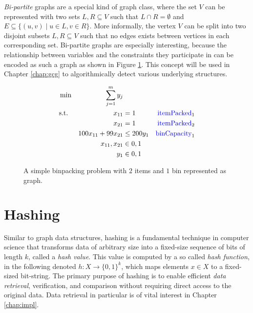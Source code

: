 		\textit{Bi-partite} graphs are a special kind of graph class, where the set $V$ can be represented with two sets $L, R \subseteq V$ such that $L \cap R = \emptyset$ and $E \subseteq \{ (u, v) \mid u \in L, v \in R \}$.
		More informally, the vertex $V$ can be split into two disjoint subsets $L, R \subseteq V$ such that no edges exists between vertices in each corresponding set.
		Bi-partite graphs are especially interesting, because the relationship between variables and the constraints they participate in can be encoded as such a graph as shown in Figure \ref{fig:prelims:graphs:binpackbipartite}. This concept will be used in Chapter \ref{chap:gcg} to algorithmically detect various underlying structures. 
		\begin{figure}[ht!]
			\centering
			\begin{minipage}{0.47\textwidth}
				
			\end{minipage}
			\begin{minipage}{0.47\textwidth}
				\begin{align}
					&\min &\sum_{j=1}^m y_j \nonumber \\
					&\text{s.t.} &x_{11} &= 1 & \text{\textcolor{blue}{itemPacked}}_1 \nonumber \\
					&& x_{21} &= 1 & \text{\textcolor{blue}{itemPacked}}_2\nonumber \\
					&& 100 x_{11} + 99 x_{21} &\leq 200 y_1 & \text{\textcolor{blue}{binCapacity}}_1\nonumber \\
					&& x_{11}, x_{21} &\in { 0, 1 }  \nonumber \\
					&& y_1 &\in { 0, 1 } \nonumber
				\end{align}
			\end{minipage}
			\caption{A simple binpacking problem with $2$ items and $1$ bin represented as  graph.}
			\label{fig:prelims:graphs:binpackbipartite}
		\end{figure}
	
		\clearpage
		
	\section{Hashing}
		
		Similar to graph data structures, hashing is a fundamental technique in computer science that transforms data of arbitrary size into a fixed-size sequence of bits of length $k$, called a \textit{hash value}. This value is computed by a so called \textit{hash function}, in the following denoted $h: X \rightarrow \{ 0, 1 \}^k$, which maps elements $x \in X$ to a fixed-sized bit-string. The primary purpose of hashing is to enable efficient \textit{data retrieval}, verification, and comparison without requiring direct access to the original data.
		Data retrieval in particular is of vital interest in Chapter \ref{chap:impl}.
		
